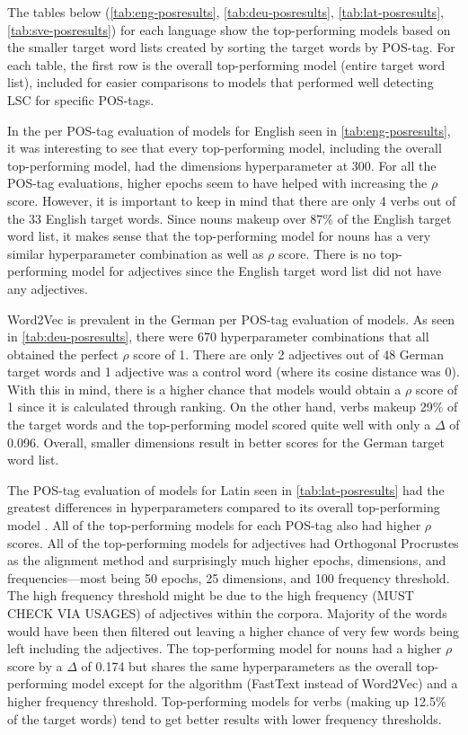 The tables below (\autoref{tab:eng-posresults}, \autoref{tab:deu-posresults}, \autoref{tab:lat-posresults}, \autoref{tab:sve-posresults}) for each language show the top-performing models based on the smaller target word lists created by sorting the target words by POS-tag. For each table, the first row is the overall top-performing model (entire target word list), included for easier comparisons to models that performed well detecting LSC for specific POS-tags. 

In the per POS-tag evaluation of models for English seen in \autoref{tab:eng-posresults}, it was interesting to see that every top-performing model, including the overall top-performing model, had the dimensions hyperparameter at 300. For all the POS-tag evaluations, higher epochs seem to have helped with increasing the $\rho$ score. However, it is important to keep in mind that there are only 4 verbs out of the 33 English target words. Since nouns makeup over 87\% of the English target word list, it makes sense that the top-performing model for nouns has a very similar hyperparameter combination as well as $\rho$ score. There is no top-performing model for adjectives since the English target word list did not have any adjectives. 


Word2Vec is prevalent in the German per POS-tag evaluation of models. As seen in \autoref{tab:deu-posresults}, there were 670 hyperparameter combinations that all obtained the perfect $\rho$ score of 1. There are only 2 adjectives out of 48 German target words and 1 adjective was a control word (where its cosine distance was 0). With this in mind, there is a higher chance that models would obtain a $\rho$ score of 1 since it is calculated through ranking. On the other hand, verbs makeup 29\% of the target words and the top-performing model scored quite well with only a $\Delta$ of 0.096. Overall, smaller dimensions result in better scores for the German target word list. 


The POS-tag evaluation of models for Latin seen in \autoref{tab:lat-posresults} had the greatest differences in hyperparameters compared to its overall top-performing model . All of the top-performing models for each POS-tag also had higher $\rho$ scores. All of the top-performing models for adjectives had Orthogonal Procrustes as the alignment method and surprisingly much higher epochs, dimensions, and frequencies—most being 50 epochs, 25 dimensions, and 100 frequency threshold. The high frequency threshold might be due to the high frequency (MUST CHECK VIA USAGES) of adjectives within the corpora. Majority of the words would have been then filtered out leaving a higher chance of very few words being left including the adjectives. The top-performing model for nouns had a higher $\rho$ score by a $\Delta$ of 0.174 but shares the same hyperparameters as the overall top-performing model except for the algorithm (FastText instead of Word2Vec) and a higher frequency threshold. Top-performing models for verbs (making up 12.5\% of the target words) tend to get better results with lower frequency thresholds.


